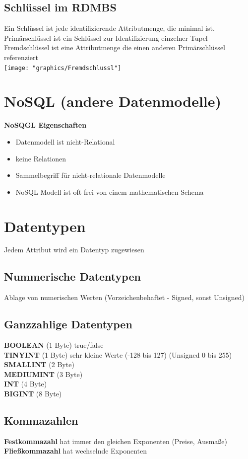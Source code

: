 \documentclass{scrreprt}
\begin{document}
\subsection{Schlüssel im RDMBS}
Ein Schlüssel ist jede identifizierende Attributmenge, die minimal ist.
\\Primärschlüssel ist ein Schlüssel zur Identifizierung einzelner Tupel
\\Fremdschlüssel ist eine Attributmenge die einen anderen Primärschlüssel referenziert
\\\texttt{[image: "graphics/Fremdschlussl"]}
\section{NoSQL (andere Datenmodelle)}
\textbf{NoSQGL Eigenschaften}
\begin{itemize}
  \item Datenmodell ist nicht-Relational
  \item keine Relationen
  \item Sammelbegriff für nicht-relationale Datenmodelle
  \item NoSQL Modell ist oft frei von einem mathematischen Schema
\end{itemize}
\section{Datentypen}
Jedem Attribut wird ein Datentyp zugewiesen
\subsection{Nummerische Datentypen}
Ablage von numerischen Werten (Vorzeichenbehaftet - Signed, sonst Unsigned)
\subsection{Ganzzahlige Datentypen}
\textbf{BOOLEAN} (1 Byte) true/false
\\\textbf{TINYINT} (1 Byte) sehr kleine Werte (-128 bis 127) (Unsigned 0 bis 255)
\\\textbf{SMALLINT} (2 Byte)
\\\textbf{MEDIUMINT} (3 Byte)
\\\textbf{INT} (4 Byte)
\\\textbf{BIGINT} (8 Byte)
\subsection{Kommazahlen}
\textbf{Festkommazahl} hat immer den gleichen Exponenten (Preise, Ausmaße)
\\\textbf{Fließkommazahl} hat wechselnde Exponenten
\end{document}
